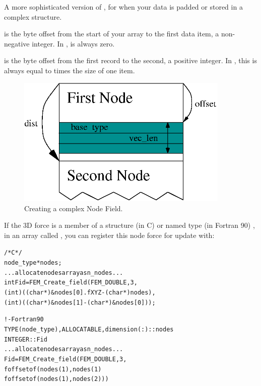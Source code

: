 \documentclass[10pt]{article}
\begin{document}

     A more sophisticated version of , for 
when your data is padded or stored in a complex structure.

      is the byte offset from the start of your array to the
first data item, a non-negative integer.  In ,
 is always zero.

      is the byte offset from the first record to the
second, a positive integer.  In , this is
always equal to  times the size of one item.

\begin{figure}[h]
\begin{center}
\includegraphics[width=4in]{fig/create_field}
\end{center}
\caption{Creating a complex Node Field.}
\label{fig:createfield}
\end{figure}


If the 3D force is a member  of a structure (in C) or named type
(in Fortran 90) , in an array called , you can
register this node force for update with:

\begin{alltt}
          /* C */
          node_type *nodes;
          ...allocate nodes array as n_nodes...
          int Fid=FEM_Create_field(FEM_DOUBLE,3,
              (int)((char *)\&nodes[0].fXYZ-(char *)nodes),
              (int)((char *)\&nodes[1]-(char *)\&nodes[0]) );
 
          ! - Fortran90
          TYPE(node_type), ALLOCATABLE, dimension(:) :: nodes
          INTEGER :: Fid
          ...allocate nodes array as n_nodes...
          Fid=FEM_Create_field(FEM_DOUBLE,3,
              foffsetof(nodes(1), nodes(1)%
              foffsetof(nodes(1), nodes(2)) )
\end{alltt}
\end{document}
